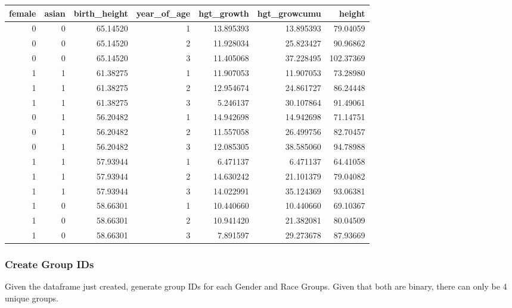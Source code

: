 \documentclass[
]{book}
\begin{document}
\begin{table}[!h]
\centering
\begin{tabular}{r|r|r|r|r|r|r}
\hline
female & asian & birth\_height & year\_of\_age & hgt\_growth & hgt\_growcumu & height\\
\hline
\rowcolor{gray!6}  0 & 0 & 65.14520 & 1 & 13.895393 & 13.895393 & 79.04059\\
\hline
0 & 0 & 65.14520 & 2 & 11.928034 & 25.823427 & 90.96862\\
\hline
\rowcolor{gray!6}  0 & 0 & 65.14520 & 3 & 11.405068 & 37.228495 & 102.37369\\
\hline
1 & 1 & 61.38275 & 1 & 11.907053 & 11.907053 & 73.28980\\
\hline
\rowcolor{gray!6}  1 & 1 & 61.38275 & 2 & 12.954674 & 24.861727 & 86.24448\\
\hline
1 & 1 & 61.38275 & 3 & 5.246137 & 30.107864 & 91.49061\\
\hline
\rowcolor{gray!6}  0 & 1 & 56.20482 & 1 & 14.942698 & 14.942698 & 71.14751\\
\hline
0 & 1 & 56.20482 & 2 & 11.557058 & 26.499756 & 82.70457\\
\hline
\rowcolor{gray!6}  0 & 1 & 56.20482 & 3 & 12.085305 & 38.585060 & 94.78988\\
\hline
1 & 1 & 57.93944 & 1 & 6.471137 & 6.471137 & 64.41058\\
\hline
\rowcolor{gray!6}  1 & 1 & 57.93944 & 2 & 14.630242 & 21.101379 & 79.04082\\
\hline
1 & 1 & 57.93944 & 3 & 14.022991 & 35.124369 & 93.06381\\
\hline
\rowcolor{gray!6}  1 & 0 & 58.66301 & 1 & 10.440660 & 10.440660 & 69.10367\\
\hline
1 & 0 & 58.66301 & 2 & 10.941420 & 21.382081 & 80.04509\\
\hline
\rowcolor{gray!6}  1 & 0 & 58.66301 & 3 & 7.891597 & 29.273678 & 87.93669\\
\hline
\end{tabular}
\end{table}

\hypertarget{create-group-ids}{%
\subsubsection{Create Group IDs}\label{create-group-ids}}

Given the dataframe just created, generate group IDs for each Gender and Race Groups. Given that both are binary, there can only be 4 unique groups.
\end{document}

